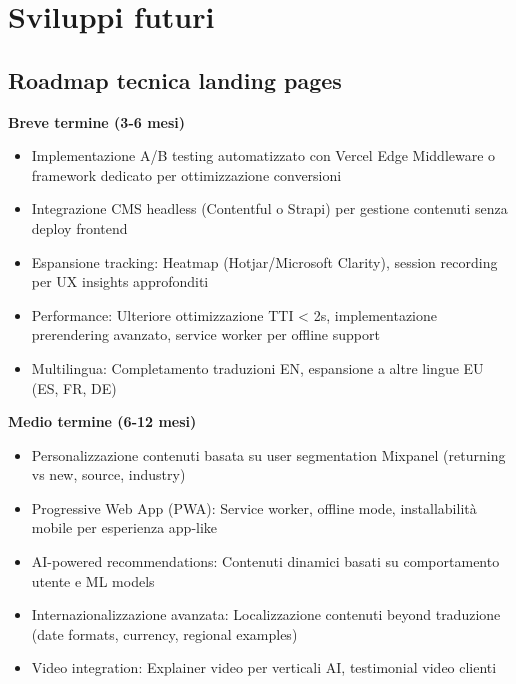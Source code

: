 \section{Sviluppi futuri}
\subsection{Roadmap tecnica landing pages}
\textbf{Breve termine (3-6 mesi)}
\begin{itemize}
  \item Implementazione A/B testing automatizzato con Vercel Edge 
        Middleware o framework dedicato per ottimizzazione conversioni
  \item Integrazione CMS headless (Contentful o Strapi) per gestione 
        contenuti senza deploy frontend
  \item Espansione tracking: Heatmap (Hotjar/Microsoft Clarity), 
        session recording per UX insights approfonditi
  \item Performance: Ulteriore ottimizzazione TTI < 2s, implementazione 
        prerendering avanzato, service worker per offline support
  \item Multilingua: Completamento traduzioni EN, espansione a altre 
        lingue EU (ES, FR, DE)
\end{itemize}

\textbf{Medio termine (6-12 mesi)}
\begin{itemize}
  \item Personalizzazione contenuti basata su user segmentation 
        Mixpanel (returning vs new, source, industry)
  \item Progressive Web App (PWA): Service worker, offline mode, 
        installabilità mobile per esperienza app-like
  \item AI-powered recommendations: Contenuti dinamici basati su 
        comportamento utente e ML models
  \item Internazionalizzazione avanzata: Localizzazione contenuti 
        beyond traduzione (date formats, currency, regional examples)
  \item Video integration: Explainer video per verticali AI, 
        testimonial video clienti
\end{itemize}

